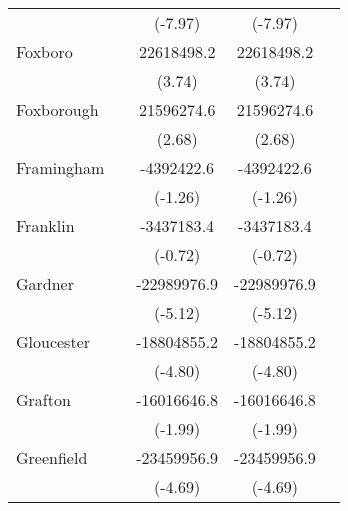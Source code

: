 {\begin{tabular}{l*{4}{c}}
                    &                     &     (-7.97)         &     (-7.97)         &                     \\
\addlinespace
Foxboro             &                     &  22618498.2\sym{***}&  22618498.2\sym{***}&                     \\
                    &                     &      (3.74)         &      (3.74)         &                     \\
\addlinespace
Foxborough          &                     &  21596274.6\sym{**} &  21596274.6\sym{**} &                     \\
                    &                     &      (2.68)         &      (2.68)         &                     \\
\addlinespace
Framingham          &                     &  -4392422.6         &  -4392422.6         &                     \\
                    &                     &     (-1.26)         &     (-1.26)         &                     \\
\addlinespace
Franklin            &                     &  -3437183.4         &  -3437183.4         &                     \\
                    &                     &     (-0.72)         &     (-0.72)         &                     \\
\addlinespace
Gardner             &                     & -22989976.9\sym{***}& -22989976.9\sym{***}&                     \\
                    &                     &     (-5.12)         &     (-5.12)         &                     \\
\addlinespace
Gloucester          &                     & -18804855.2\sym{***}& -18804855.2\sym{***}&                     \\
                    &                     &     (-4.80)         &     (-4.80)         &                     \\
\addlinespace
Grafton             &                     & -16016646.8\sym{*}  & -16016646.8\sym{*}  &                     \\
                    &                     &     (-1.99)         &     (-1.99)         &                     \\
\addlinespace
Greenfield          &                     & -23459956.9\sym{***}& -23459956.9\sym{***}&                     \\
                    &                     &     (-4.69)         &     (-4.69)         &                     \\

\end{tabular}}
